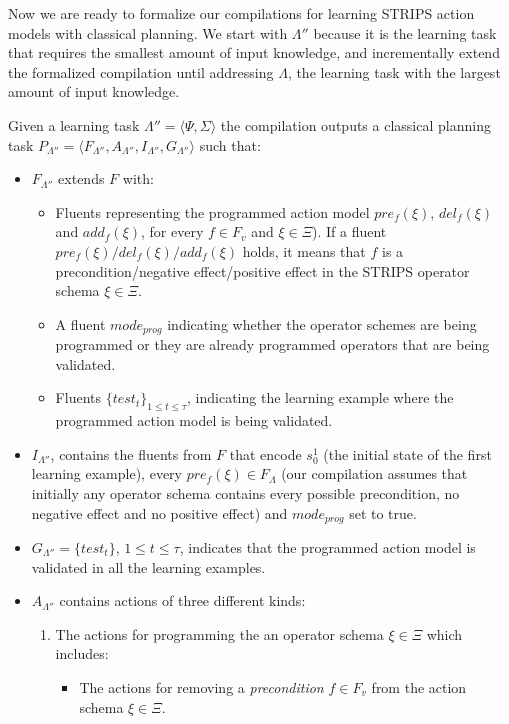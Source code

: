\documentclass[letterpaper]{article} %
\newcommand{\tup}[1]{{\langle #1 \rangle}}
\begin{document}
Now we are ready to formalize our compilations for learning STRIPS action models with classical planning. We start with $\Lambda''$ because it is the learning task that requires the smallest amount of input knowledge, and incrementally extend the formalized compilation until addressing $\Lambda$, the learning task with the largest amount of input knowledge.

Given a learning task $\Lambda''=\tup{\Psi,\Sigma}$ the compilation outputs a classical planning task $P_{\Lambda''}=\tup{F_{\Lambda''},A_{\Lambda''},I_{\Lambda''},G_{\Lambda''}}$ such that:
\begin{itemize}
\item $F_{\Lambda''}$ extends $F$ with:
\begin{itemize}
\item Fluents representing the programmed action model $pre_f(\xi)$, $del_f(\xi)$ and $add_f(\xi)$, for every $f\in F_v$ and $\xi \in \Xi$). If a fluent $pre_f(\xi)/del_f(\xi)/add_f(\xi)$ holds, it means that $f$ is a precondition/negative effect/positive effect in the STRIPS operator schema $\xi\in \Xi$. 
\item A fluent $mode_{prog}$ indicating whether the operator schemes are being programmed or they are already programmed operators that are being validated. 
\item Fluents $\{test_t\}_{1\leq t\leq \tau}$, indicating the learning example where the programmed action model is being validated.
\end{itemize}
\item $I_{\Lambda''}$, contains the fluents from $F$ that encode $s_0^1$ (the initial state of the first learning example), every $pre_f(\xi)\in F_{\Lambda}$ (our compilation assumes that initially any operator schema contains every possible precondition, no negative effect and no positive effect) and $mode_{prog}$ set to true. 
\item $G_{\Lambda''}=\{test_t\}$, {\small $1\leq t\leq \tau$}, indicates that the programmed action model is validated in all the learning examples.
\item $A_{\Lambda''}$ contains actions of three different kinds:
\begin{enumerate}
\item The actions for programming the an operator schema $\xi\in\Xi$ which includes:
\begin{itemize}
\item The actions for removing a {\em precondition} $f\in F_v$ from the action schema $\xi\in\Xi$. 


\end{itemize}
\end{enumerate}
\end{itemize}
\end{document}
